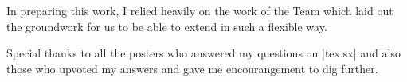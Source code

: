 
In preparing this work, I relied heavily on the work of the \latexe Team which laid out the groundwork for
us to be able to extend \latex in such a flexible way.

Special thanks to all the posters who answered my questions on |tex.sx| and also those who upvoted my answers and gave me encourangement to dig further.

\vfill

